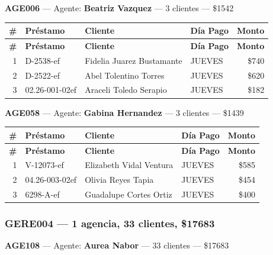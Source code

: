 \documentclass[11pt,a4paper]{article}
\newcommand{\money}[1]{\$\num{#1}}
\begin{document}
\noindent\textbf{AGE006} --- Agente: \textbf{Beatriz Vazquez} --- 3 clientes --- \money{1542}


\begin{center}
\renewcommand{\arraystretch}{1.1}
\footnotesize
\begin{longtable}{rlp{6.5cm}lr}
\toprule
\textbf{\#} & \textbf{Pr\'estamo} & \textbf{Cliente} & \textbf{D\'ia Pago} & \textbf{Monto} \\
\midrule
\endfirsthead
\toprule
\textbf{\#} & \textbf{Pr\'estamo} & \textbf{Cliente} & \textbf{D\'ia Pago} & \textbf{Monto} \\
\midrule
\endhead
1 & D-2538-ef & Fidelia Juarez Bustamante & JUEVES & \money{740} \\
2 & D-2522-ef & Abel Tolentino Torres & JUEVES & \money{620} \\
3 & 02.26-001-02ef & Araceli Toledo Serapio & JUEVES & \money{182} \\

\bottomrule
\end{longtable}
\end{center}
\noindent\textbf{AGE058} --- Agente: \textbf{Gabina Hernandez} --- 3 clientes --- \money{1439}


\begin{center}
\renewcommand{\arraystretch}{1.1}
\footnotesize
\begin{longtable}{rlp{6.5cm}lr}
\toprule
\textbf{\#} & \textbf{Pr\'estamo} & \textbf{Cliente} & \textbf{D\'ia Pago} & \textbf{Monto} \\
\midrule
\endfirsthead
\toprule
\textbf{\#} & \textbf{Pr\'estamo} & \textbf{Cliente} & \textbf{D\'ia Pago} & \textbf{Monto} \\
\midrule
\endhead
1 & V-12073-ef & Elizabeth Vidal Ventura & JUEVES & \money{585} \\
2 & 04.26-003-02ef & Olivia Reyes Tapia & JUEVES & \money{454} \\
3 & 6298-A-ef & Guadalupe Cortes Ortiz & JUEVES & \money{400} \\

\bottomrule
\end{longtable}
\end{center}
\subsubsection{GERE004 --- 1 agencia, 33 clientes, \money{17683}}

\noindent\textbf{AGE108} --- Agente: \textbf{Aurea Nabor} --- 33 clientes --- \money{17683}
\end{document}
